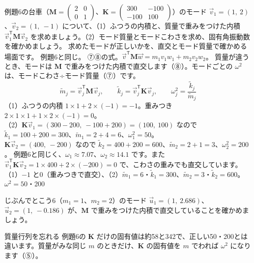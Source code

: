 \label{ph:波-3:ex12}
\begin{phreidai}[モードの直交とモード質量]
例題6の台車（$\mathbf M=\begin{pmatrix}2&0\\0&1\end{pmatrix}$、$\mathbf K=\begin{pmatrix}300&-100\\-100&100\end{pmatrix}$）のモード $\vec v_1=(1,\ 2)$、$\vec v_2=(1,\ -1)$ について、（1）ふつうの内積と、質量で重みをつけた内積 $\vec v_1^{\mathsf T}\mathbf M\vec v_2$ を求めましょう。（2）モード質量とモードこわさを求め、固有角振動数を確かめましょう。
\phbamen
求めたモードが正しいかを、直交とモード質量で確かめる場面です。
\phmushi
例題6と同じ。
\phzu
⑦⑧の式。$\vec v^{\mathsf T}\mathbf M\vec w=m_1v_1w_1+m_2v_2w_2$。
\phriyu
質量が違うとき、モードは $\mathbf M$ で重みをつけた内積で直交します（⑧）。モードごとの $\omega^2$ は、モードこわさ÷モード質量（⑦）です。
\phtateru
\[\tilde m_j=\vec v_j^{\mathsf T}\mathbf M\vec v_j,\qquad\tilde k_j=\vec v_j^{\mathsf T}\mathbf K\vec v_j,\qquad\omega_j^2=\frac{\tilde k_j}{\tilde m_j}\]
\phtoku
（1）ふつうの内積 $1\times1+2\times(-1)=-1$。重みつき $2\times1\times1+1\times2\times(-1)=0$。\\
（2）$\mathbf K\vec v_1=(300-200,\ -100+200)=(100,\ 100)$ なので $\tilde k_1=100+200=300$、$\tilde m_1=2+4=6$、$\omega_1^2=50$。\\
$\mathbf K\vec v_2=(400,\ -200)$ なので $\tilde k_2=400+200=600$、$\tilde m_2=2+1=3$、$\omega_2^2=200$。
\phtashikame
例題6と同じく、$\omega_1\approx7.07$、$\omega_2\approx14.1$ です。また $\vec v_1^{\mathsf T}\mathbf K\vec v_2=1\times400+2\times(-200)=0$ で、こわさの重みでも直交しています。
\kotae （1）$-1$ と0（重みつきで直交）、（2）$\tilde m_1=6$・$\tilde k_1=300$、$\tilde m_2=3$・$\tilde k_2=600$。$\omega^2=50$・200
\end{phreidai}
\begin{jibun}
じぶんでとこう6（$m_1=1$、$m_2=2$）のモード $\vec u_1=(1,\ 2.686)$、$\vec u_2=(1,\ -0.186)$ が、$\mathbf M$ で重みをつけた内積で直交していることを確かめましょう。
\end{jibun}

\begin{tsumazuki}{質量行列を忘れる}
例題6の $\mathbf K$ だけの固有値は約58と342で、正しい50・200とは違います。質量がみな同じ $m$ のときだけ、$\mathbf K$ の固有値を $m$ でわれば $\omega^2$ になります（⑤）。
\end{tsumazuki}

